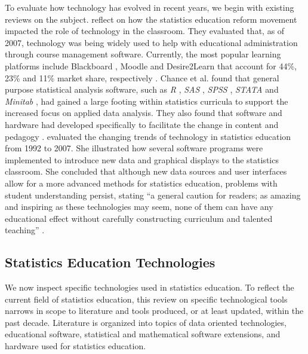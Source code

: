 \documentclass[11pt]{isuthesis}
\begin{document}
To evaluate how technology has evolved in recent years, we begin with existing reviews on the subject. \citet{chance2007} reflect on how the statistics education reform movement impacted the role of technology in the classroom. They evaluated that, as of 2007, technology was being widely used to help with educational administration through course management software. Currently, the most popular learning platforms include Blackboard \citep{Blackboard}, Moodle \citep{Moodle} and Desire2Learn \citep{Desire2Learn} that account for 44\%, 23\% and 11\% market share, respectively \citep{CampusComputing}. Chance et al. found that general purpose statistical analysis software, such as \textit{R} \citep{R}, \textit{SAS} \citep{SAS}, \textit{SPSS} \citep{SPSS}, \textit{STATA} \citep{STATA} and \textit{Minitab} \citep{Minitab}, had gained a large footing within statistics curricula to support the increased focus on applied data analysis. They also found that software and hardware had developed specifically to facilitate the change in content and pedagogy \citep{chance2007}. \citet{Rubin2007} evaluated the changing trends of technology in statistics education from 1992 to 2007. She illustrated how several software programs were implemented to introduce new data and graphical displays to the statistics classroom. She concluded that although new data sources and user interfaces allow for a more advanced methods for statistics education, problems with student understanding persist, stating ``a general caution for readers; as amazing and inspiring as these technologies may seem, none of them can have any educational effect without carefully constructing curriculum and talented teaching'' \citep[p.2]{Rubin2007}. 

\subsection{Statistics Education Technologies} 

We now inspect specific technologies used in statistics education.  To reflect the current field of statistics education, this review on specific technological tools narrows in scope to literature and tools produced, or at least updated, within the past decade. %
Literature is organized into topics of data oriented technologies, educational software, statistical and mathematical software extensions, and hardware used for statistics education.
\end{document}
